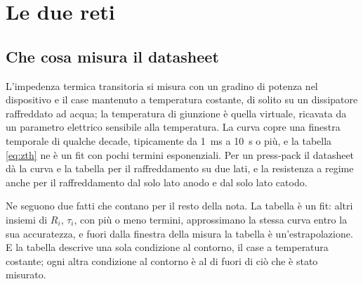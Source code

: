 \documentclass[10pt,a4paper]{scrartcl}
\begin{document}
\section{Le due reti}
\label{sec:networks}

\subsection{Che cosa misura il datasheet}
L'impedenza termica transitoria si misura con un gradino di potenza nel dispositivo e il case mantenuto a temperatura costante, di solito su un dissipatore raffreddato ad acqua; la temperatura di giunzione è quella virtuale, ricavata da un parametro elettrico sensibile alla temperatura. La curva copre una finestra temporale di qualche decade, tipicamente da \SI{1}{\milli\second} a \SI{10}{\second} o più, e la tabella \eqref{eq:zth} ne è un fit con pochi termini esponenziali. Per un press-pack il datasheet dà la curva e la tabella per il raffreddamento su due lati, e la resistenza a regime anche per il raffreddamento dal solo lato anodo e dal solo lato catodo.

Ne seguono due fatti che contano per il resto della nota. La tabella è un fit: altri insiemi di $R_i$, $\tau_i$, con più o meno termini, approssimano la stessa curva entro la sua accuratezza, e fuori dalla finestra della misura la tabella è un'estrapolazione. E la tabella descrive una sola condizione al contorno, il case a temperatura costante; ogni altra condizione al contorno è al di fuori di ciò che è stato misurato.
\end{document}
